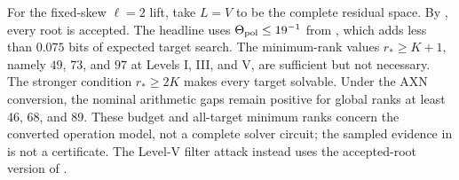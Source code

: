 \documentclass[11pt]{article}
\begin{document}
For the fixed-skew $\ell=2$ lift, take $L=V$ to be the complete residual space.
By , every root is accepted.  The headline uses
$\Theta_{\rm pol}\le19^{-1}$ from , which
adds less than $0.075$ bits of expected target search.  The minimum-rank values
$r_*\ge K+1$, namely $49$, $73$, and $97$ at Levels I, III, and V, are
sufficient but not necessary.
The stronger condition $r_*\ge2K$ makes every target solvable.  Under the AXN
conversion, the nominal arithmetic gaps remain positive for global ranks at least
46, 68, and 89.  These budget and all-target minimum ranks concern the converted operation
model, not a complete solver circuit; the sampled evidence in
 is not a certificate.  The Level-V filter attack instead
uses the accepted-root version of .
\end{document}
